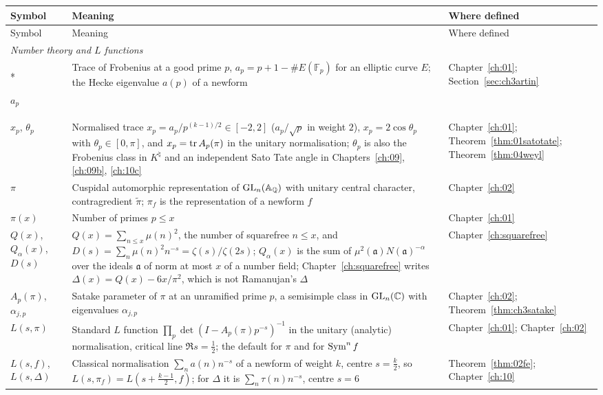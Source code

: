 {\footnotesize\setlength{\tabcolsep}{3pt}
\begin{longtable}{p{0.8in}p{2.65in}p{0.95in}}
\toprule
Symbol & Meaning & Where defined\\
\midrule
\endfirsthead
\toprule
Symbol & Meaning & Where defined\\
\midrule
\endhead
\multicolumn{3}{l}{\textit{Number theory and $L$ functions}}\\*
\raggedright $a_p$ & \raggedright Trace of Frobenius at a good prime $p$, $a_p=p+1-\#E(\mathbb F_p)$ for an elliptic curve $E$; the Hecke eigenvalue $a(p)$ of a newform & \raggedright Chapter~\ref{ch:01}; Section~\ref{sec:ch3artin}\tabularnewline[1pt]
\raggedright $x_p$, $\theta_p$ & \raggedright Normalised trace $x_p=a_p/p^{(k-1)/2}\in[-2,2]$ ($a_p/\sqrt p$ in weight $2$), $x_p=2\cos\theta_p$ with $\theta_p\in[0,\pi]$, and $x_p=\operatorname{tr} A_p(\pi)$ in the unitary normalisation; $\theta_p$ is also the Frobenius class in $K^\natural$ and an independent Sato Tate angle in Chapters~\ref{ch:09}, \ref{ch:09b}, \ref{ch:10c} & \raggedright Chapter~\ref{ch:01}; Theorem~\ref{thm:01satotate}; Theorem~\ref{thm:04weyl}\tabularnewline[1pt]
\raggedright $\pi$ & \raggedright Cuspidal automorphic representation of $\mathrm{GL}_n(\mathbb{A}_{\mathbb{Q}})$ with unitary central character, contragredient $\tilde\pi$; $\pi_f$ is the representation of a newform $f$ & \raggedright Chapter~\ref{ch:02}\tabularnewline[1pt]
\raggedright $\pi(x)$ & \raggedright Number of primes $p\le x$ & \raggedright Chapter~\ref{ch:01}\tabularnewline[1pt]
\raggedright $Q(x)$, $Q_\alpha(x)$, $D(s)$ & \raggedright $Q(x)=\sum_{n\le x}\mu(n)^2$, the number of squarefree $n\le x$, and $D(s)=\sum_n\mu(n)^2n^{-s}=\zeta(s)/\zeta(2s)$; $Q_\alpha(x)$ is the sum of $\mu^2(\mathfrak a)N(\mathfrak a)^{-\alpha}$ over the ideals $\mathfrak a$ of norm at most $x$ of a number field; Chapter~\ref{ch:squarefree} writes $\Delta(x)=Q(x)-6x/\pi^2$, which is not Ramanujan's $\Delta$ & \raggedright Chapter~\ref{ch:squarefree}\tabularnewline[1pt]
\raggedright $A_p(\pi)$, $\alpha_{j,p}$ & \raggedright Satake parameter of $\pi$ at an unramified prime $p$, a semisimple class in $\mathrm{GL}_n(\mathbb{C})$ with eigenvalues $\alpha_{j,p}$ & \raggedright Chapter~\ref{ch:02}; Theorem~\ref{thm:ch3satake}\tabularnewline[1pt]
\raggedright $L(s,\pi)$ & \raggedright Standard $L$ function $\prod_p\det(I-A_p(\pi)p^{-s})^{-1}$ in the unitary (analytic) normalisation, critical line $\Re s=\frac12$; the default for $\pi$ and for $\operatorname{Sym}^nf$ & \raggedright Chapter~\ref{ch:01}; Chapter~\ref{ch:02}\tabularnewline[1pt]
\raggedright $L(s,f)$, $L(s,\Delta)$ & \raggedright Classical normalisation $\sum_na(n)n^{-s}$ of a newform of weight $k$, centre $s=\frac k2$, so $L(s,\pi_f)=L(s+\frac{k-1}2,f)$; for $\Delta$ it is $\sum_n\tau(n)n^{-s}$, centre $s=6$ & \raggedright Theorem~\ref{thm:02fe}; Chapter~\ref{ch:10}\tabularnewline[1pt]

\end{longtable}}
